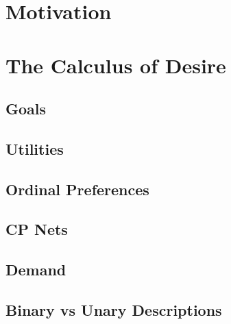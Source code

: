 \documentclass{article}
\begin{document}
%	
%	
%	
%	
%	
%	
	
	
	
	\section{Motivation}
	
	\section{The Calculus of Desire} %
	
	\subsection{Goals}
	
	\subsection{Utilities}
	\subsection{Ordinal Preferences}
	\subsection{CP Nets}
	\subsection{Demand}
	\subsection{Binary vs Unary Descriptions}
	
\end{document}
